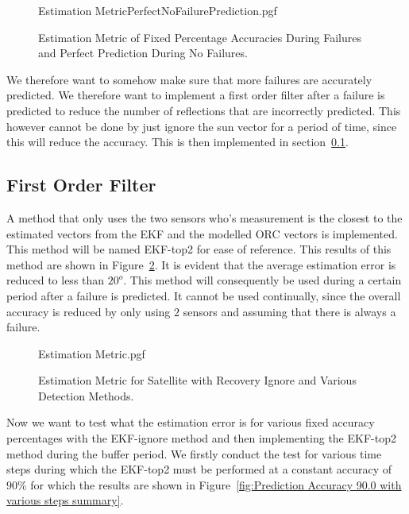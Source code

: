 \documentclass[letterpaper, 10 pt, conference]{ieeeconf}  %
\begin{document}
\begin{figure}[!htb]
	\begin{center}
		{Estimation MetricPerfectNoFailurePrediction.pgf}
	\end{center}
	\caption[Estimation Metric of Fixed Percentage Accuracies During Failures and Perfect Prediction During No Failures]{Estimation Metric of Fixed Percentage Accuracies During Failures and Perfect Prediction During No Failures.}
	\label{fig:Estimation Accuracy EKF-ignore Comparison PerfectNoFailure}
\end{figure}

We therefore want to somehow make sure that more failures are accurately predicted. We therefore want to implement a first order filter after a failure is predicted to reduce the number of reflections that are incorrectly predicted. This however cannot be done by just ignore the sun vector for a period of time, since this will reduce the accuracy. This is then implemented in section~\ref{section:First Order Filter}.

\subsection{First Order Filter}
\label{section:First Order Filter}
A method that only uses the two sensors who's measurement is the closest to the estimated vectors from the EKF and the modelled ORC vectors is implemented. This method will be named EKF-top2 for ease of reference. This results of this method are shown in Figure~\ref{fig:Estimation Accuracy EKF-top2 summary}. It is evident that the average estimation error is reduced to less than $20^o$. This method will consequently be used during a certain period after a failure is predicted. It cannot be used continually, since the overall accuracy is reduced by only using $2$ sensors and assuming that there is always a failure.

\begin{figure}[!htb]
	\begin{center}
		{Estimation Metric.pgf}
	\end{center}
	\caption[Estimation Metric for Satellite with Recovery Ignore and Various detection Methods]{Estimation Metric for Satellite with Recovery Ignore and Various Detection Methods.}
	\label{fig:Estimation Accuracy EKF-top2 summary}
\end{figure}

Now we want to test what the estimation error is for various fixed accuracy percentages with the EKF-ignore method and then implementing the EKF-top2 method during the buffer period. We firstly conduct the test for various time steps during which the EKF-top2 must be performed at a constant accuracy of $90\%$ for which the results are shown in Figure~\ref{fig:Prediction Accuracy 90.0 with various steps summary}. 
\end{document}
